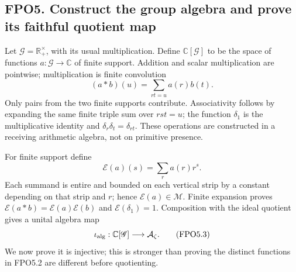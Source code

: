 \subsection{FPO5. Construct the group algebra and prove its faithful
quotient
map}\label{fpo5.-construct-the-group-algebra-and-prove-its-faithful-quotient-map}

Let \(\mathscr G=\mathbb R_+^\times\), with its usual multiplication.
Define \(\mathbb C[\mathscr G]\) to be the space of functions
\(a:\mathscr G\to\mathbb C\) of finite support. Addition and scalar
multiplication are pointwise; multiplication is finite convolution \[
(a*b)(u)=\sum_{rt=u}a(r)b(t).
\tag{FPO5.1}
\] Only pairs from the two finite supports contribute. Associativity
follows by expanding the same finite triple sum over \(rst=u\); the
function \(\delta_1\) is the multiplicative identity and
\(\delta_r\delta_t=\delta_{rt}\). These operations are constructed in a
receiving arithmetic algebra, not on primitive presence.

For finite support define \[
\mathscr E(a)(s)=\sum_r a(r)r^s.
\tag{FPO5.2}
\] Each summand is entire and bounded on each vertical strip by a
constant depending on that strip and \(r\); hence
\(\mathscr E(a)\in\mathcal M\). Finite expansion proves
\(\mathscr E(a*b)=\mathscr E(a)\mathscr E(b)\) and
\(\mathscr E(\delta_1)=1\). Composition with the ideal quotient gives a
unital algebra map \[
\iota_{\rm alg}:\mathbb C[\mathscr G]\longrightarrow\mathcal A_\zeta.
\tag{FPO5.3}
\] We now prove it is injective; this is stronger than proving the
distinct functions in FPO5.2 are different before quotienting.

